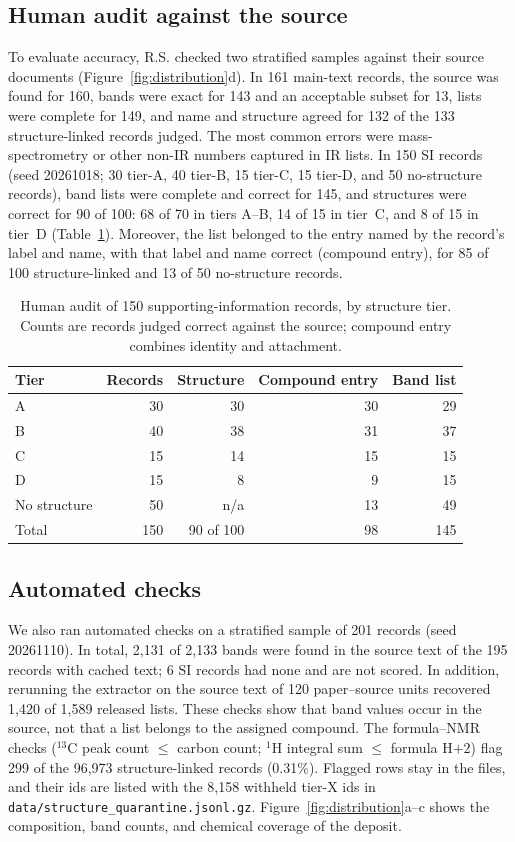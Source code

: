 \documentclass[pdflatex,sn-nature]{sn-jnl}
\begin{document}
\subsection{Human audit against the source}

To evaluate accuracy, R.S. checked two stratified samples against their source
documents (Figure~\ref{fig:distribution}d).
In 161 main-text records, the source was found for 160, bands were exact for 143 and an
acceptable subset for 13, lists were complete for 149, and name and structure agreed for
132 of the 133 structure-linked records judged.
The most common errors were mass-spectrometry or other non-IR numbers captured in IR
lists.
In 150 SI records (seed 20261018; 30 tier-A, 40 tier-B, 15 tier-C, 15 tier-D, and 50
no-structure records), band lists were complete and correct for 145, and structures
were correct for 90 of 100: 68 of 70 in tiers A--B, 14 of 15 in tier~C, and 8 of 15 in
tier~D (Table~\ref{tab:audit150}).
Moreover, the list belonged to the entry named by the record's label and name, with
that label and name correct (compound entry), for 85 of 100 structure-linked and 13 of
50 no-structure records.

\begin{table}[!htbp]
\caption{Human audit of 150 supporting-information records, by structure tier.
Counts are records judged correct against the source; compound entry combines identity and attachment.}\label{tab:audit150}
\small
\begin{tabular}{@{}lrrrr@{}}
\toprule
Tier & Records & Structure & Compound entry & Band list \\
\midrule
A & 30 & 30 & 30 & 29 \\
B & 40 & 38 & 31 & 37 \\
C & 15 & 14 & 15 & 15 \\
D & 15 & 8 & 9 & 15 \\
No structure & 50 & n/a & 13 & 49 \\
\midrule
Total & 150 & 90 of 100 & 98 & 145 \\
\bottomrule
\end{tabular}
\end{table}

\subsection{Automated checks}

We also ran automated checks on a stratified sample of 201 records (seed 20261110).
In total, 2,131 of 2,133 bands were found in the source text of the 195 records with
cached text; 6 SI records had none and are not scored.
In addition, rerunning the extractor on the source text of 120 paper--source units recovered 1,420 of
1,589 released lists.
These checks show that band values occur in the source, not that a list belongs to the
assigned compound.
The formula--NMR checks ($^{13}$C peak count $\leq$ carbon count; $^{1}$H integral sum
$\leq$ formula H$+2$) flag 299 of the 96,973 structure-linked records (0.31\%).
Flagged rows stay in the files, and their ids are listed with the 8,158 withheld
tier-X ids in \texttt{data/structure\_quarantine.jsonl.gz}.
Figure~\ref{fig:distribution}a--c shows the composition, band counts, and chemical
coverage of the deposit.
\end{document}
